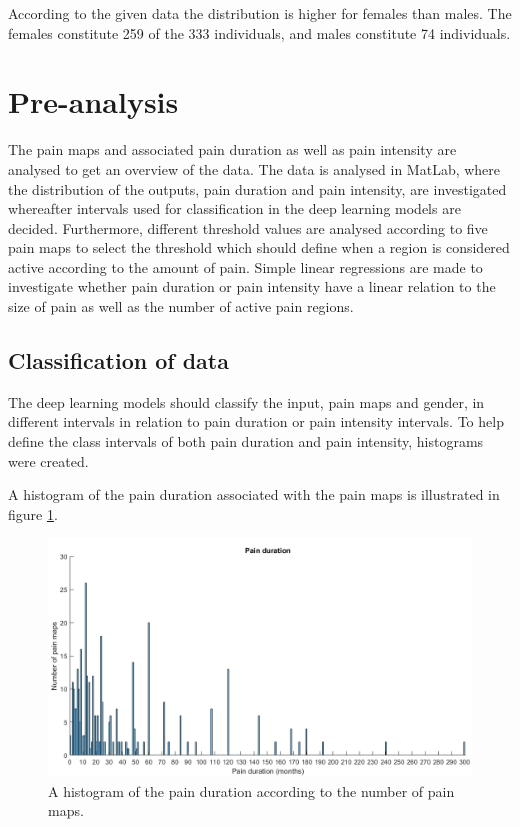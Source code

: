 \noindent
According to the given data the distribution is higher for females than males. The females constitute 259 of the 333 individuals, and males constitute 74 individuals.  \newpage

\section{Pre-analysis}
The pain maps and associated pain duration as well as pain intensity are analysed to get an overview of the data. The data is analysed in MatLab, where the distribution of the outputs, pain duration and pain intensity, are investigated whereafter intervals used for classification in the deep learning models are decided. Furthermore, different threshold values are analysed according to five pain maps to select the threshold which should define when a region is considered active according to the amount of pain.
Simple linear regressions are made to investigate whether pain duration or pain intensity have a linear relation to the size of pain as well as the number of active pain regions.


\subsection{Classification of data}
The deep learning models should classify the input, pain maps and gender, in different intervals in relation to pain duration or pain intensity intervals. To help define the class intervals of both pain duration and pain intensity, histograms were created.

\noindent
A histogram of the pain duration associated with the pain maps is illustrated in figure \ref{fig:histoduration}.

\begin{figure} [H]
\centering
\includegraphics[width=1\textwidth]{figures/histogramDuration}
\caption{A histogram of the pain duration according to the number of pain maps.}
\label{fig:histoduration}
\end{figure}

